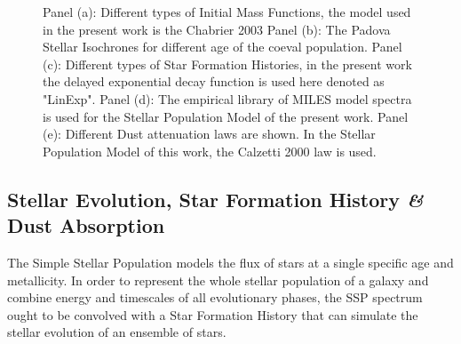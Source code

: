 \begin{figure}
   \quad 
  \caption{Panel (a): Different types of Initial Mass Functions, the model used in the present work is the Chabrier 2003\cite{Chabrier2003} Panel (b): The Padova\cite{Padova1994} \cite{Padova2000} \cite{Padova2008} Stellar Isochrones for different age of the coeval population. Panel (c): Different types of Star Formation Histories, in the present work the delayed exponential decay function is used here denoted as "LinExp". Panel (d): The empirical library of MILES model spectra \cite{MILES2}\cite{MILES2}\cite{MILES3} is used for the Stellar Population Model of the present work. Panel (e): Different Dust attenuation laws are shown. In the Stellar Population Model of this work, the Calzetti 2000\cite{Calzetti2000} law is used. }
  \label{fig:SSP_all}
\end{figure}

\subsection{Stellar Evolution, Star Formation History \textit{\&} Dust Absorption}\label{sec:SFH}
The Simple Stellar Population models the flux of stars at a single specific age and metallicity. In order to represent the whole stellar population of a galaxy and combine energy and timescales of all evolutionary phases, the SSP spectrum ought to be convolved with a Star Formation History that can simulate the stellar evolution of an ensemble of stars. 
